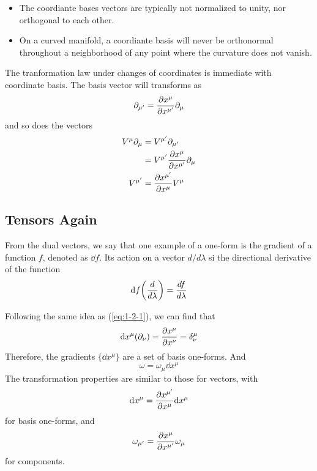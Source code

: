 \documentclass[11pt]{article}
\theoremstyle{definition}
\numberwithin{equation}{section}
\begin{document}
\begin{itemize}
    \item The coordiante bases vectors are typically not normalized to unity, nor orthogonal to each other.
    \item On a curved manifold, a coordiante basis will never be orthonormal throughout a neighborhood of any point where the curvature does not vanish.
\end{itemize}
The tranformation law under changes of coordinates is immediate with coordinate basis. The basis vector will transforms as 
\begin{equation}
    \partial_{\mu'}=\pdv{x^\mu}{x^{\mu'}}\partial_\mu
\end{equation}
and so does the vectors 
\begin{equation}
    \begin{aligned}
        V^\mu\partial_\mu &= V^{\mu'}\partial_{\mu'}\\
        &= V^{\mu'}\pdv{x^\mu}{x^{\mu'}}\partial_\mu\\
        V^{\mu'} &= \pdv{x^{\mu'}}{x^\mu}V^\mu
    \end{aligned}
\end{equation}

\subsection{Tensors Again}
From the dual vectors, we say that one example of a one-form is the gradient of a function $f$, denoted as $\dd f$. Its action on a vector $d/d\lambda$ si the directional derivative of the function 
\begin{equation}
    \dd f\qty(\frac{d}{d\lambda})=\frac{df}{d\lambda}
\end{equation}

Following the same idea as (\ref{eq:1-2-1}), we can find that
\begin{equation}
    \dd x^\mu(\partial_\nu)=\pdv{x^\mu}{x^\nu}=\delta_\nu^\mu
\end{equation}
Therefore, the gradients $\{\dd x^\mu\}$ are a set of basis one-forms. And 
\begin{equation}
    \omega=\omega_\mu \dd x^\mu
\end{equation}
The transformation properties are similar to those for vectors, with
\begin{equation}
    \dd x^\mu=\pdv{x^{\mu'}}{x^\mu}\dd x^\mu
\end{equation}
for basis one-forms, and 
\begin{equation}
    \omega_{\mu'}=\pdv{x^\mu}{x^{\mu'}}\omega_\mu 
\end{equation}
for components.
\end{document}
